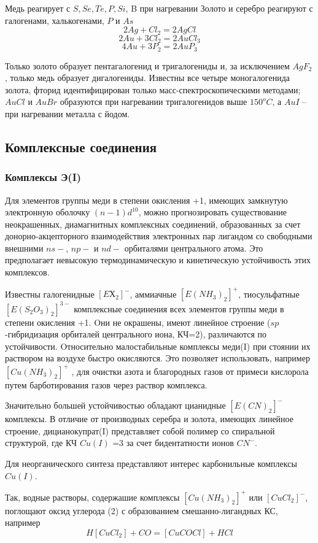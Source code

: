 \documentclass[11pt]{article}
\begin{document}
Медь реагирует с $S, Se, Te, P, Si$, B при нагревании
Золото и серебро реагируют с галогенами, халькогенами, $P$ и $As$
$$2Ag + Cl_2 = 2AgCl$$
$$2Au + 3Cl_2 = 2AuCl_3$$
$$4Au + 3P_2 = 2AuP_3$$

Только золото образует пентагалогенид и тригалогениды и, за исключением $AgF_2$,
только медь образует дигалогениды. Известны все четыре моногалогенида золота, фторид
идентифицирован только масс-спектроскопическими методами; $AuCl$ и $AuBr$ образуются
при нагревании тригалогенидов выше $150^oC$, а $AuI$ – при нагревании металла с йодом.
\subsection{Комплексные соединения}
\subsubsection{Комплексы Э(I)}
Для элементов группы меди в степени окисления +1, имеющих замкнутую
электронную оболочку $(n-1)d^{10}$, можно прогнозировать существование неокрашенных,
диамагнитных комплексных соединений, образованных за счет донорно-акцепторного
взаимодействия электронных пар лигандом со свободными внешними $ns-$, $np-$ и $nd-$
орбиталями центрального атома. Это предполагает невысокую термодинамическую и
кинетическую устойчивость этих комплексов.

Известны галогенидные $[EХ_2]^-$, аммиачные $[E(NH_3)_2]^+$, тиосульфатные $[E(S_2O_3)_2]^{3-}$
комплексные соединения всех элементов группы меди в степени окисления +1. Oни не
окрашены, имеют линейное строение ($sp$-гибридизация орбиталей центрального иона,
КЧ=2), различаются по устойчивости. Oтносительно малостабильные комплексы меди(I)
при стоянии их раствором на воздухе быстро окисляются. Это позволяет использовать,
например $[Cu(NH_3)_2]^+$
, для очистки азота и благородных газов от примеси кислорола
путем барботирования газов через раствор комплекса.

Значительно большей устойчивостью обладают цианидные $[E(CN)_2]^-$
комплексы. В
отличие от производных серебра и золота, имеющих линейное строение,
дицианокупрат(I) представляет собой полимер со спиральной структурой, где КЧ $Cu(I)$ =3 за счет бидентатности ионов $CN^-$.

Для неорганического синтеза представляют интерес карбонильные комплексы $Cu(I)$.

Так, водные растворы, содержашие комплексы $[Cu(NH_3)_2]^+$ или $[CuCl_2]^-$, поглощают оксид
углерода (2) с образованием смешанно-лигандных КС, например
$$H[CuCl_2] + CO = [CuCOCl] + HCl$$
\end{document}
